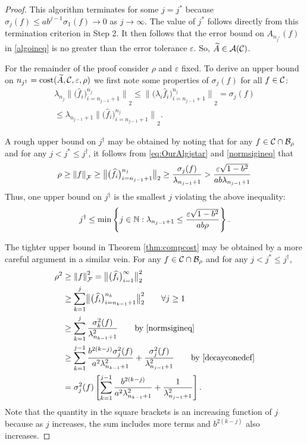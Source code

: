 \documentclass[graybox,footinfo]{svmult}
\newcommand{\DHJRnorm}[2][{}]{\ensuremath{\left \lVert #2 \right \rVert}_{#1}}
\newcommand{\DHJRbignorm}[2][{}]{\ensuremath{\bigl \lVert #2 \bigr \rVert}_{#1}}
\begin{document}
\begin{proof}
This algorithm terminates for some $j = j^*$ because $\sigma_j(f) \le ab^{j-1} \sigma_{1}(f) \to 0$ as $j \to \infty$. The value of $j^*$ follows directly from this termination criterion in Step 2.  It then follows that the error bound on $A_{n_{j^*}}(f)$ in \eqref{algoineq} is no greater than the error tolerance $\varepsilon$.  So, $\widetilde{A} \in {\mathcal{A}}({\mathcal{C}})$.

For the remainder of the proof consider $\rho$ and $\varepsilon$ fixed.  To derive an upper bound on $n_{j^\dagger} = \textup{cost}(\widetilde{A},{\mathcal{C}},\varepsilon,\rho)$ we first note some properties of $\sigma_j(f)$ for all $f \in {\mathcal{C}}$:
\begin{multline} \label{normsigineq}
\lambda_{n_j} \DHJRbignorm[2]{\big( \widehat{f}_i \big)_{i=n_{j-1}+1}^{n_j}} \le 
\DHJRbignorm[2]{\big( \lambda_i \widehat{f}_i \big)_{i=n_{j-1}+1}^{n_j}} = \sigma_j(f) 
\\
\le \lambda_{n_{j-1}+1} \DHJRbignorm[2]{\big( \widehat{f}_i \big)_{i=n_{j-1}+1}^{n_j}}.
\end{multline}

A rough upper bound on $j^\dagger$ may be obtained by noting that for any $f \in {\mathcal{C}} \cap {\mathcal{B}}_\rho$ and for any $j < j^* \le j^\dagger$, it follows from \eqref{eq:OurAlgjstar} and \eqref{normsigineq} that 
\begin{equation*}
\rho \ge \DHJRnorm[\calF]{f} \ge \DHJRbignorm[2]{\big( \widehat{f}_i \big)_{i=n_{j-1}+1}^{n_j}} \ge \frac{\sigma_j(f)}{\lambda_{n_{j-1}+1}} > \frac{\varepsilon\sqrt{1 - b^2}}{ab \lambda_{n_{j-1}+1}}
\end{equation*}
Thus, one upper bound on $j^\dagger$ is the smallest $j$ violating the above inequality:
\begin{equation} \label{jdaggerlast}
j^\dagger \le \min \left \{j \in \bbN :  \lambda_{n_{j-1}+1} \le \frac{\varepsilon\sqrt{1 - b^2}}{ab \rho} \right\}.
\end{equation}

The tighter upper bound in Theorem \ref{thm:compcost} may be obtained by a more careful argument in a similar vein.  
For any $f \in  {\mathcal{C}} \cap {\mathcal{B}}_\rho$ and for any $j < j^* \le j^\dagger$,
\begin{align*}
\rho^2 &\ge \DHJRnorm[\calF]{f}^2 = \DHJRbignorm[2]{\big( \widehat{f}_i \big)_{i=1}^{\infty}}^2 \\
& \ge \sum_{k=1}^j \DHJRbignorm[2]{\big( \widehat{f}_i \big)_{i=n_{k-1}+1}^{n_k}}^2 \qquad \forall j \ge 1\\
& \ge \sum_{k=1}^j \frac{\sigma_k^2(f)}{\lambda_{n_{k-1}+1}^2} \qquad \text{by \eqref{normsigineq}}\\
& \ge \sum_{k=1}^{j-1} \frac{ b^{2(k-j)}\sigma_j^2(f)}{a^{2}\lambda_{n_{k-1}+1}^2} + \frac{\sigma_j^2(f)}{\lambda_{n_{j-1}+1}^2} \qquad \text{by \eqref{decayconedef}} \\
& = \sigma_j^2(f) \left[ \sum_{k=1}^{j-1} \frac{b^{2(k-j)}}{a^{2} \lambda_{n_{k-1}+1}^2} + \frac{1}{\lambda_{n_{j-1}+1}^2}\right].
\end{align*}
Note that the quantity in the square brackets is an increasing function of $j$ because as $j$ increases, the sum includes more terms and $b^{2(k-j)}$ also increases.


\end{proof}
\end{document}
